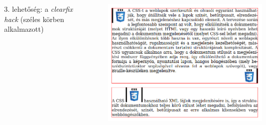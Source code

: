 \begin{frame}
\begin{columns}[c]
\begin{exampleblock}{}
      \end{exampleblock}
  \end{columns}
\end{frame}

\begin{frame}
  \begin{columns}[c]
      3. lehetőség: a \emph{clearfix hack} (széles körben alkalmazott)
      \begin{exampleblock}{}
        \scriptsize
        
        
      \end{exampleblock}
      \includegraphics[width=\textwidth]{lebeg5.png}
  \end{columns}
\end{frame}
